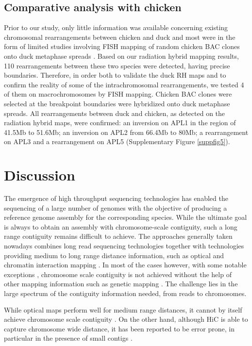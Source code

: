 \documentclass[10pt,letterpaper]{article}
\begin{document}
\subsection*{Comparative analysis with chicken}

Prior to our study, only little information was available concerning existing chromosomal rearrangements between chicken and duck and most were in the form of limited studies involving FISH mapping of random chicken BAC clones onto duck metaphase spreads \cite{Huang2006,Fillon2007,Skinner2009}. Based on our radiation hybrid mapping results, 110 rearrangements between these two species were detected, having precise boundaries. Therefore, in order both to validate the duck RH maps and to confirm the reality of some of the intrachromosomal rearrangements, we tested 4 of them on macrochromosomes by FISH mapping. Chicken BAC clones were selected at the breakpoint boundaries were hybridized onto duck metaphase spreads. All rearrangements between duck and chicken, as detected on the radiation hybrid maps, were confirmed: an inversion on APL1 in the region of 41.5Mb to 51.6Mb; an inversion on APL2 from 66.4Mb to 80Mb; a rearrangement on APL3 and a rearrangement on APL5 (Supplementary Figure \ref{suppfig5}).

\section*{Discussion}

The emergence of high throughput sequencing technologies has enabled the sequencing of a large number of genomes with the objective of producing a reference genome assembly for the corresponding species. 
While the ultimate goal is always to obtain an assembly with chromosome-scale contiguity, such a long range contiguity remains difficult to achieve. 
The approaches generally taken nowadays combines long read sequencing technologies together with technologies providing medium to long range distance information, such as optical and chromatin interaction mapping \cite{Schwartz1993, Burton2013}. 
In most of the cases however, with some notable exceptions \cite{Bickhart2017a,Peichel2017a,Jibran2018a}, chromosome scale contiguity is not achieved without the help of other mapping information such as genetic mapping \cite{Belser2018a, Lang2018a, Smith2019a}. The challenge lies in the large spectrum of the contiguity information needed, from reads to chromosomes. 

While optical maps perform well for medium range distances, it cannot by itself achieve chromosome scale contiguity \cite{Bickhart2017a}. On the other hand, although HiC is able to capture chromosome wide distance, it has been reported to be error prone, in particular in the presence of small contigs \cite{Burton2013, Dudchenko2017}.
\end{document}
